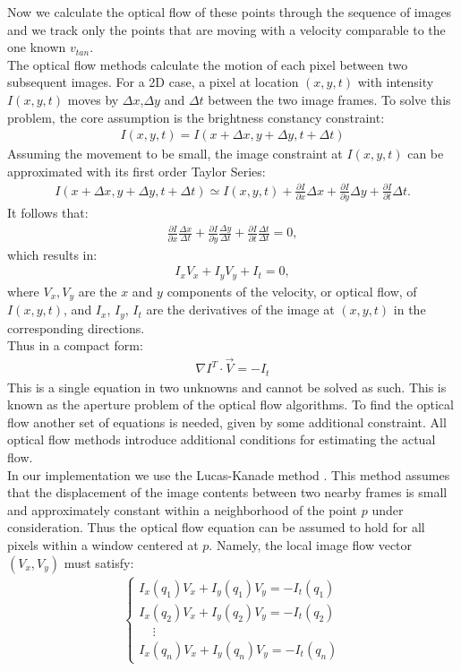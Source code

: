Now we calculate the optical flow of these points through the sequence of images and we track only the points that are moving with a velocity comparable to the one known $v_{tan}$.\\
The optical flow methods \cite{beauchemin1995computation} calculate the motion of each pixel between two subsequent images.
For a 2D case, a pixel at location $(x,y,t)$ with intensity $I(x,y,t)$ moves by $\Delta x$,$\Delta y$ and $\Delta t$ between the two image frames. To solve this problem, the core assumption is the brightness constancy constraint:
\begin{align}
I(x,y,t) = I(x+\Delta x, y + \Delta y, t + \Delta t)
\end{align}
Assuming the movement to be small, the image constraint at $I(x,y,t)$ can be approximated with its first order Taylor Series:
\begin{align}
I(x+\Delta x,y+\Delta y,t+\Delta t) \simeq I(x,y,t) + \frac{\partial I}{\partial x}\Delta x+\frac{\partial I}{\partial y}\Delta y+\frac{\partial I}{\partial t}\Delta t.
\end{align}
It follows that:
\begin{align}
 \frac{\partial I}{\partial x}\frac{\Delta x}{\Delta t}+\frac{\partial I}{\partial y}\frac{\Delta y}{\Delta t}+\frac{\partial I}{\partial t}\frac{\Delta t}{\Delta t} = 0,
\end{align}
which results in:
\begin{align}
 I_{x}V_x+I_{y}V_y+I_{t}= 0,
\end{align}
where $V_x,V_y$ are the $x$ and $y$ components of the velocity, or optical flow, of $I(x,y,t)$, and $I_{x}$, $I_{y}$, $I_{t}$ are the derivatives of the image at $(x,y,t)$ in the corresponding directions.\\
Thus in a compact form:
\begin{align}
 \nabla I^T\cdot\vec{V} = -I_t
\end{align}
This is a single equation in two unknowns and cannot be solved as such. This is known as the aperture problem of the optical flow algorithms. To find the optical flow another set of equations is needed, given by some additional constraint. All optical flow methods introduce additional conditions for estimating the actual flow.\\
In our implementation we use the Lucas-Kanade method \cite{lucas1981iterative}. This method assumes that the displacement of the image contents between two nearby frames is small and approximately constant within a neighborhood of the point $p$ under consideration. Thus the optical flow equation can be assumed to hold for all pixels within a window centered at $p$. Namely, the local image flow vector $(V_{x},V_{y})$ must satisfy:
\begin{align}
\begin{cases}
I_{x}(q_{1})V_{x}+I_{y}(q_{1})V_{y}=-I_{t}(q_{1})  \\[10pt]
I_{x}(q_{2})V_{x}+I_{y}(q_{2})V_{y}=-I_{t}(q_{2})  \\[10pt]
\ \ \ \ \ \vdots \\[10pt]
I_{x}(q_{n})V_{x}+I_{y}(q_{n})V_{y}=-I_{t}(q_{n}) 
\end{cases}
\end{align}

